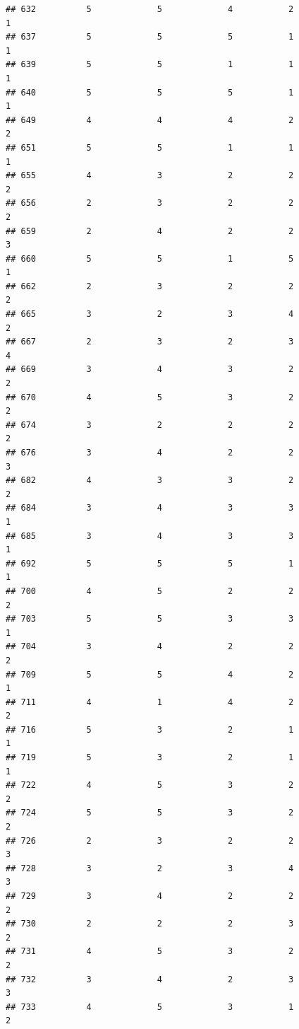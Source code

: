 \documentclass[
]{article}
\begin{document}
\begin{verbatim}
## 632          5             5             4           2             1
## 637          5             5             5           1             1
## 639          5             5             1           1             1
## 640          5             5             5           1             1
## 649          4             4             4           2             2
## 651          5             5             1           1             1
## 655          4             3             2           2             2
## 656          2             3             2           2             2
## 659          2             4             2           2             3
## 660          5             5             1           5             1
## 662          2             3             2           2             2
## 665          3             2             3           4             2
## 667          2             3             2           3             4
## 669          3             4             3           2             2
## 670          4             5             3           2             2
## 674          3             2             2           2             2
## 676          3             4             2           2             3
## 682          4             3             3           2             2
## 684          3             4             3           3             1
## 685          3             4             3           3             1
## 692          5             5             5           1             1
## 700          4             5             2           2             2
## 703          5             5             3           3             1
## 704          3             4             2           2             2
## 709          5             5             4           2             1
## 711          4             1             4           2             2
## 716          5             3             2           1             1
## 719          5             3             2           1             1
## 722          4             5             3           2             2
## 724          5             5             3           2             2
## 726          2             3             2           2             3
## 728          3             2             3           4             3
## 729          3             4             2           2             2
## 730          2             2             2           3             2
## 731          4             5             3           2             2
## 732          3             4             2           3             3
## 733          4             5             3           1             2

\end{verbatim}
\end{document}
